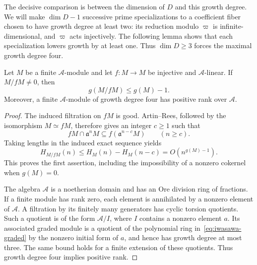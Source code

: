 The decisive comparison is between the dimension of $D$ and this
growth degree. We will make $\dim D-1$ successive prime specializations
to a coefficient fiber chosen to have growth degree at least two:
its reduction modulo $\varpi$ is infinite-dimensional, and $\varpi$
acts injectively. The following lemma shows that each specialization
lowers growth by at least one. Thus $\dim D\geq3$ forces the maximal
growth degree four.

\begin{lemma}\label{lem:growth-drop}
Let $M$ be a finite $\mathscr A$-module and let $f:M\to M$ be
injective and $\mathscr A$-linear.  If $M/fM\ne0$, then
\[
                 g(M/fM)\leq g(M)-1.
\]
Moreover, a finite $\mathscr A$-module of growth degree four has
positive rank over $\mathscr A$.
\end{lemma}
\begin{proof}
The induced filtration on $fM$ is good.  Artin--Rees, followed by the
isomorphism $M\simeq fM$, therefore gives an integer $c\geq1$ such that
\[
 fM\cap\mathfrak a^nM\subseteq f(\mathfrak a^{n-c}M)
 \qquad(n\geq c).
\]
Taking lengths in the induced exact sequence yields
\[
 H_{M/fM}(n)
 \leq H_M(n)-H_M(n-c)=O(n^{g(M)-1}).
\]
This proves the first assertion, including the impossibility of a
nonzero cokernel when $g(M)=0$.

The algebra $\mathscr A$ is a noetherian domain and has an Ore
division ring of fractions.  If a finite module has rank zero,
each element is annihilated by a nonzero element of $\mathscr A$.
A filtration by its finitely many generators has cyclic torsion
quotients.  Such a quotient is of the form $\mathscr A/I$, where
$I$ contains a nonzero element $a$.  Its associated graded module
is a quotient of the polynomial ring in~\eqref{eq:iwasawa-graded}
by the nonzero initial form of $a$, and hence has growth degree at
most three.  The same bound holds for a finite extension of these
quotients.  Thus growth degree four implies positive rank.
\end{proof}

